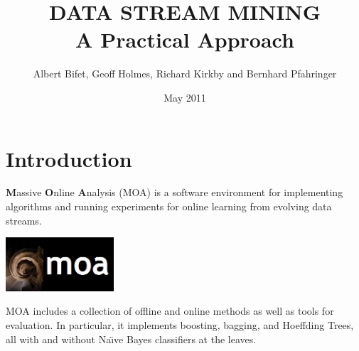 \documentclass[a4paper,12pt,twoside]{book}
\title{
\textbf{DATA STREAM MINING\\ A Practical Approach} %
 }
\author{Albert Bifet, Geoff Holmes, Richard Kirkby and Bernhard Pfahringer}
\date{May 2011}%
\begin{document}
\lstset{language=Java,basicstyle=\tiny,numbers=left}



\maketitle
{}
\thispagestyle{empty}
\cleardoublepage
\thispagestyle{empty}
\tableofcontents
\cleardoublepage
{}

\def\adwin{{\tt ADWIN }}
\def\thesis{text }
\def\thesisc{text}


\chapter*{Introduction}
\thispagestyle{empty}

{\bf M}assive {\bf O}nline {\bf A}nalysis (MOA) is a %
software environment for implementing algorithms and running experiments
for online learning from %
evolving data streams.

\begin{center}
\includegraphics[height=2cm]{figures/LogoMOA.jpg} \end{center}

MOA includes a collection of offline and online methods as well as tools for evaluation. 
In particular, it implements boosting, bagging, and Hoeffding Trees, all %
with and without Na{\"\i}ve Bayes classifiers at the leaves. 

\end{document}
